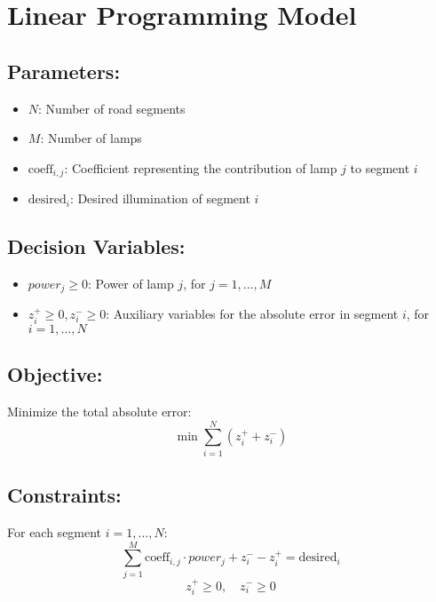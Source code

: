 \documentclass{article}
\begin{document}
\section*{Linear Programming Model}

\subsection*{Parameters:}
\begin{itemize}
    \item \( N \): Number of road segments
    \item \( M \): Number of lamps
    \item \( \text{coeff}_{i,j} \): Coefficient representing the contribution of lamp \( j \) to segment \( i \)
    \item \( \text{desired}_i \): Desired illumination of segment \( i \)
\end{itemize}

\subsection*{Decision Variables:}
\begin{itemize}
    \item \( power_j \geq 0 \): Power of lamp \( j \), for \( j = 1, \ldots, M \)
    \item \( z_i^+ \geq 0, z_i^- \geq 0 \): Auxiliary variables for the absolute error in segment \( i \), for \( i = 1, \ldots, N \)
\end{itemize}

\subsection*{Objective:}
Minimize the total absolute error:
\[
\min \sum_{i=1}^{N} (z_i^+ + z_i^-)
\]

\subsection*{Constraints:}
For each segment \( i = 1, \ldots, N \):
\[
\sum_{j=1}^{M} \text{coeff}_{i,j} \cdot power_j + z_i^- - z_i^+ = \text{desired}_i
\]
\[
z_i^+ \geq 0, \quad z_i^- \geq 0
\]
\end{document}
